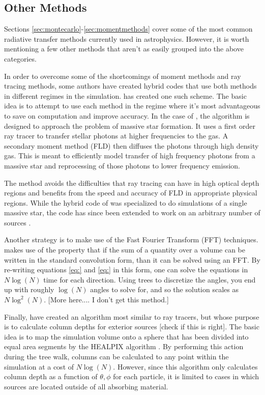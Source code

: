 \subsection{Other Methods}
\label{sec:othermethods}

Sections \ref{sec:montecarlo}-\ref{sec:momentmethods} cover some of the most common radiative transfer methods currently used in astrophysics. However, it is worth mentioning a few other methods that aren't as easily grouped into the above categories.

In order to overcome some of the shortcomings of moment methods and ray tracing methods, some authors have created hybrid codes that use both methods in different regimes in the simulation. \citet{kuiperEt10} has created one such scheme. The basic idea is to attempt to use each method in the regime where it's most advantageous to save on computation and improve accuracy. In the case of \citet{kuiperEt10}, the algorithm is designed to approach the problem of massive star formation. It uses a first order ray tracer to transfer stellar photons at higher frequencies to the gas. A secondary moment method (FLD) then diffuses the photons through high density gas. This is meant to efficiently model transfer of high frequency photons from a massive star and reprocessing of those photons to lower frequency emission.

The method avoids the difficulties that ray tracing can have in high optical depth regions and benefits from the speed and accuracy of FLD in appropriate physical regions. While the hybrid code of \citet{kuiperEt10} was specialized to do simulations of a single massive star, the code has since been extended to work on an arbitrary number of sources \citep{klassenEt2014}.

Another strategy is to make use of the Fast Fourier Transform (FFT) techniques. \citet{cen02} makes use of the property that if the sum of a quantity over a volume can be written in the standard convolution form, than it can be solved using an FFT. By re-writing equations \ref{eq:} and \ref{eq:} in this form, one can solve the equations in $N\log(N)$ time for each direction. Using trees to discretize the angles, you end up with roughly $\log(N)$ angles to solve for, and so the solution scales as $N\log^2(N)$. [More here.... I don't get this method.]

Finally, \citet{clarkEt12} have created an algorithm most similar to ray tracers, but whose purpose is to calculate column depths for exterior sources [check if this is right]. The basic idea is to map the simulation volume onto a sphere that has been divided into equal area segments by the HEALPIX algorithm \citep{gorski99}. By performing this action during the tree walk, columns can be calculated to any point within the simulation at a cost of $N\log(N)$. However, since this algorithm only calculates column depth as a function of $\theta, \phi$ for each particle, it is limited to cases in which sources are located outside of all absorbing material.

